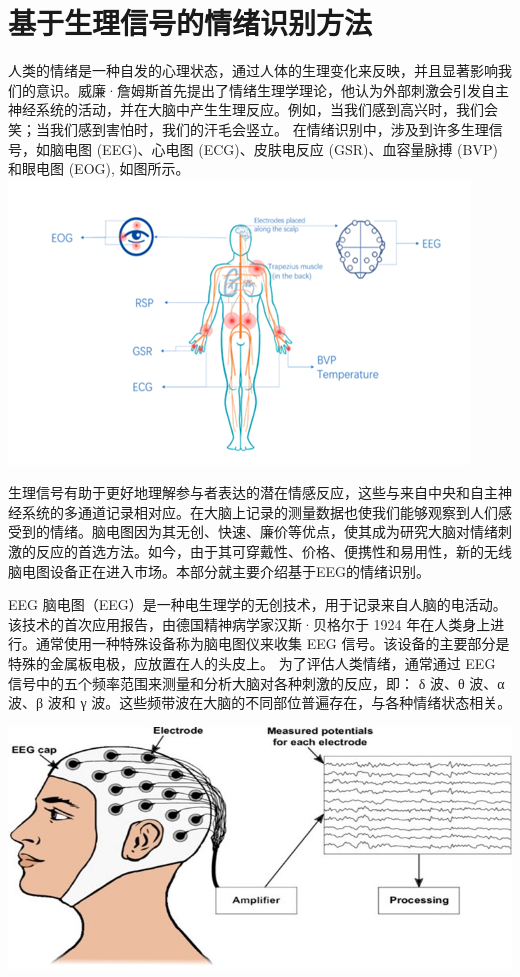 \documentclass[conference]{IEEEtran}
\begin{document}
\section*{基于生理信号的情绪识别方法}
人类的情绪是一种自发的心理状态，通过人体的生理变化来反映，并且显著影响我们的意识。威廉·詹姆斯首先提出了情绪生理学理论，他认为外部刺激会引发自主神经系统的活动，并在大脑中产生生理反应。例如，当我们感到高兴时，我们会笑；当我们感到害怕时，我们的汗毛会竖立。 在情绪识别中，涉及到许多生理信号，如脑电图 (EEG)、心电图 (ECG)、皮肤电反应 (GSR)、血容量脉搏 (BVP) 和眼电图 (EOG), 如图所示。
\includegraphics*[scale=0.8]{images/humanbody.png}

生理信号有助于更好地理解参与者表达的潜在情感反应，这些与来自中央和自主神经系统的多通道记录相对应。在大脑上记录的测量数据也使我们能够观察到人们感受到的情绪。脑电图因为其无创、快速、廉价等优点，使其成为研究大脑对情绪刺激的反应的首选方法。如今，由于其可穿戴性、价格、便携性和易用性，新的无线脑电图设备正在进入市场。本部分就主要介绍基于EEG的情绪识别。

EEG 脑电图（EEG）是一种电生理学的无创技术，用于记录来自人脑的电活动。该技术的首次应用报告，由德国精神病学家汉斯·贝格尔于 1924 年在人类身上进行。通常使用一种特殊设备称为脑电图仪来收集 EEG 信号。该设备的主要部分是特殊的金属板电极，应放置在人的头皮上。 为了评估人类情绪，通常通过 EEG 信号中的五个频率范围来测量和分析大脑对各种刺激的反应，即： δ 波、θ 波、α 波、β 波和 γ 波。这些频带波在大脑的不同部位普遍存在，与各种情绪状态相关。



 \includegraphics*[scale=0.8]{images/tools.jpg}   
\end{document}
